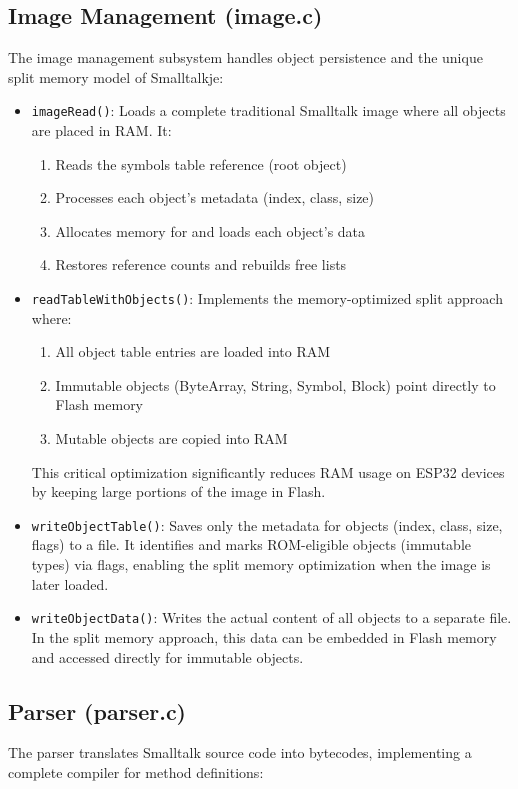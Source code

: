 \documentclass[12pt,a4paper]{report}
\begin{document}
\subsection{Image Management (image.c)}
The image management subsystem handles object persistence and the unique split memory model of Smalltalkje:

\begin{itemize}
    \item \texttt{imageRead()}: Loads a complete traditional Smalltalk image where all objects are placed in RAM. It:
    \begin{enumerate}
        \item Reads the symbols table reference (root object)
        \item Processes each object's metadata (index, class, size)
        \item Allocates memory for and loads each object's data
        \item Restores reference counts and rebuilds free lists
    \end{enumerate}

    \item \texttt{readTableWithObjects()}: Implements the memory-optimized split approach where:
    \begin{enumerate}
        \item All object table entries are loaded into RAM
        \item Immutable objects (ByteArray, String, Symbol, Block) point directly to Flash memory
        \item Mutable objects are copied into RAM
    \end{enumerate}
    This critical optimization significantly reduces RAM usage on ESP32 devices by keeping large portions of the image in Flash.

    \item \texttt{writeObjectTable()}: Saves only the metadata for objects (index, class, size, flags) to a file. It identifies and marks ROM-eligible objects (immutable types) via flags, enabling the split memory optimization when the image is later loaded.

    \item \texttt{writeObjectData()}: Writes the actual content of all objects to a separate file. In the split memory approach, this data can be embedded in Flash memory and accessed directly for immutable objects.
\end{itemize}

\subsection{Parser (parser.c)}
The parser translates Smalltalk source code into bytecodes, implementing a complete compiler for method definitions:
\end{document}
